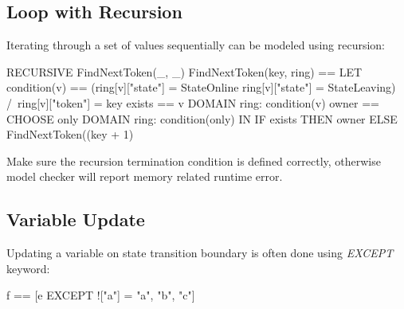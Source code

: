 \subsection{Loop with Recursion}

Iterating through a set of values sequentially can be modeled using recursion:\\
\begin{tla}
RECURSIVE FindNextToken(_, _)
FindNextToken(key, ring) ==
    LET 
        condition(v) == 
            (ring[v]["state"] = StateOnline 
                  \/ ring[v]["state"] = StateLeaving)
                /\ ring[v]["token"] = key
        exists == \E v \in DOMAIN ring: condition(v)
        owner == CHOOSE only \in DOMAIN ring: condition(only)
    IN 
        IF exists THEN
            owner
        ELSE 
            FindNextToken((key + 1) %
\end{tla}
\begin{tlatex}
%
%
%
%
%
%
%
%
%
%
%
%
\end{tlatex}

Make sure the recursion termination condition is defined correctly, otherwise
model checker will report memory related runtime error.

\subsection{Variable Update}

Updating a variable on state transition boundary is often done using
\textit{EXCEPT} keyword:\\

\begin{tla}
f == [e EXCEPT !["a"] = {"a", "b", "c"}]
\end{tla}
\begin{tlatex}
\end{tlatex}
\\

